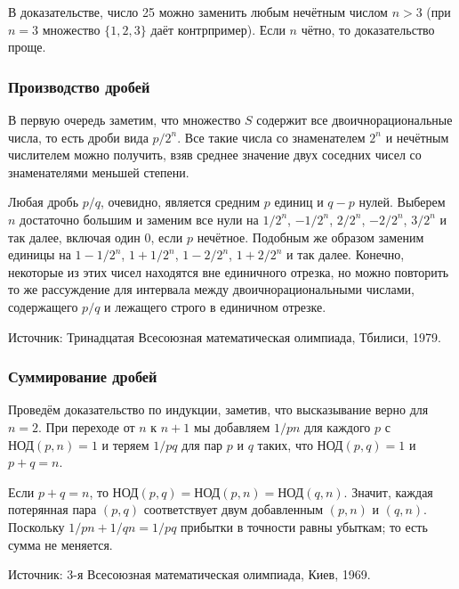 В доказательстве, число 25 можно заменить любым нечётным числом $n> 3$ (при $n=3$ множество $\{1,2,3\}$ даёт контрпример).
Если $n$ чётно, то доказательство проще. 


\subsubsection*{Производство дробей}%

В первую очередь заметим, что множество $S$ содержит все двоичнорациональные числа, 
то есть дроби вида $p/2^n$.
Все такие числа со знаменателем $2^n$ и нечётным числителем можно получить, взяв среднее значение двух соседних чисел со знаменателями меньшей степени.

Любая дробь $p/q$, очевидно, является средним $p$ единиц и $q-p$ нулей.
Выберем $n$ достаточно большим и заменим все нули на $1/2^n$, $-1/2^n$, $2/2^n$, $-2/2^n$, $3/2^n$ и так далее, включая один $0$, если $p$ нечётное.
Подобным же образом заменим единицы на $1-1/2^n$, $1+1/2^n$, $1-2/2^n$, $1+2/2^n$ и так далее.
Конечно, некоторые из этих чисел находятся вне единичного отрезка, но можно повторить то же рассуждение для интервала между двоичнорациональными числами, содержащего $p/q$ и лежащего строго в единичном отрезке.%
\heart

Источник: Тринадцатая Всесоюзная математическая олимпиада, Тбилиси, 1979.

\subsubsection*{Суммирование дробей}%

Проведём доказательство по индукции, заметив, что высказывание верно для $n=2$.
При переходе от $n$ к $n+1$ мы добавляем $1/pn$ для каждого $p$ с $\text{НОД}(p,n)=1$ и теряем $1/pq$ для пар $p$ и $q$ таких, что $\text{НОД}(p,q)=1$ и $p+q=n$.

Если $p+q=n$, то
$\text{НОД}(p,q)=\text{НОД}(p,n)=\text{НОД}(q,n)$.
Значит, каждая потерянная пара $(p,q)$ соответствует двум добавленным $(p,n)$ и $(q,n)$.
Поскольку $1/pn+1/qn=1/pq$ прибытки в точности равны  убыткам; то есть сумма не меняется.
\heart

Источник: 3-я Всесоюзная математическая олимпиада, Киев, 1969.

